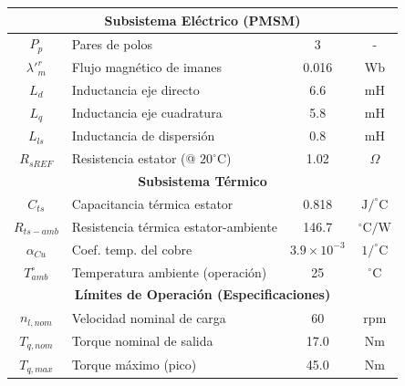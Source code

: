 \documentclass[12pt, a4paper,journal, onecolumn, compsoc]{IEEEtran}
\begin{document}
\begin{table}[htbp]
\begin{tabular}{|c|l|c|c|}
        \hline
        \multicolumn{4}{|c|}{\textbf{Subsistema Eléctrico (PMSM)}} \\
        \hline
        $P_p$ & Pares de polos & 3 & - \\
        $\lambda'^r_m$ & Flujo magnético de imanes & 0.016 & Wb \\
        $L_d$ & Inductancia eje directo & 6.6 & mH \\
        $L_q$ & Inductancia eje cuadratura & 5.8 & mH \\
        $L_{ls}$ & Inductancia de dispersión & 0.8 & mH \\
        $R_{sREF}$ & Resistencia estator (@ $20^\circ$C) & 1.02 & $\Omega$ \\
        \hline
        \multicolumn{4}{|c|}{\textbf{Subsistema Térmico}} \\
        \hline
        $C_{ts}$ & Capacitancia térmica estator & 0.818 & $\text{J}/^\circ\text{C}$ \\
        $R_{ts-amb}$ & Resistencia térmica estator-ambiente & 146.7 & $^\circ\text{C}/\text{W}$ \\
        $\alpha_{Cu}$ & Coef. temp. del cobre & $3.9 \times 10^{-3}$ & $1/^\circ\text{C}$ \\
        $T_{amb}^\circ$ & Temperatura ambiente (operación) & 25 & $^\circ\text{C}$ \\
        \hline
        \multicolumn{4}{|c|}{\textbf{Límites de Operación (Especificaciones)}} \\
        \hline
        $n_{l,nom}$ & Velocidad nominal de carga & 60 & rpm \\
        $T_{q,nom}$ & Torque nominal de salida & 17.0 & Nm \\
        $T_{q,max}$ & Torque máximo (pico) & 45.0 & Nm \\
        \hline
    \end{tabular}
    \label{tab:parametros}
\end{table}
\end{document}
